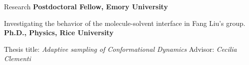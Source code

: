 \begin{rubric}{Research}
%
	\textbf{Postdoctoral Fellow, Emory University}
  \par Investigating the behavior of the molecule-solvent interface in Fang Liu's group. 
\entry*[2014 -- 2020]%
  \textbf{Ph.D., Physics, Rice University}
  \par Thesis title: \emph{Adaptive sampling of Conformational Dynamics} Advisor: \emph{Cecilia Clementi}
\end{rubric}
